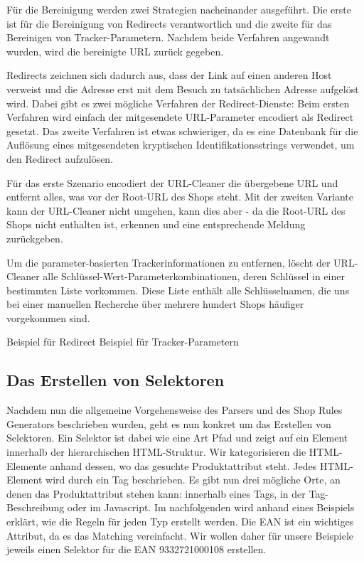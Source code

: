 Für die Bereinigung werden zwei Strategien nacheinander ausgeführt.
Die erste ist für die Bereinigung von Redirects verantwortlich und die zweite für das Bereinigen von Tracker-Parametern.
Nachdem beide Verfahren angewandt wurden, wird die bereinigte URL zurück gegeben.

Redirects zeichnen sich dadurch aus, dass der Link auf einen anderen Host verweist und die Adresse erst mit dem
Besuch zu tatsächlichen Adresse aufgelöst wird.
Dabei gibt es zwei mögliche Verfahren der Redirect-Dienste:
Beim ersten Verfahren wird einfach der mitgesendete URL-Parameter encodiert als Redirect gesetzt.
Das zweite Verfahren ist etwas schwieriger, da es eine Datenbank für die Auflösung eines mitgesendeten kryptischen
Identifikationsstrings verwendet, um den Redirect aufzulösen.

Für das erste Szenario encodiert der URL-Cleaner die übergebene URL und entfernt alles, was vor der Root-URL des
Shops steht.
Mit der zweiten Variante kann der URL-Cleaner nicht umgehen, kann dies aber - da die Root-URL des Shops nicht
enthalten ist, erkennen und eine entsprechende Meldung zurückgeben.

Um die parameter-basierten Trackerinformationen zu entfernen, löscht der URL-Cleaner alle
Schlüssel-Wert-Parameterkombinationen, deren Schlüssel in einer bestimmten Liste vorkommen.
Diese Liste enthält alle Schlüsselnamen, die uns bei einer manuellen Recherche über mehrere hundert Shops häufiger
vorgekommen sind.

Beispiel für Redirect
Beispiel für Tracker-Parametern

\subsection{Das Erstellen von Selektoren}
\label{subsec:erstellen-von-selektoren}

Nachdem nun die allgemeine Vorgehensweise des Parsers und des Shop Rules Generators beschrieben wurden, geht es nun
konkret um das Erstellen von Selektoren.
Ein Selektor ist dabei wie eine Art Pfad und zeigt auf ein Element innerhalb der hierarchischen HTML-Struktur.
Wir kategorisieren die HTML-Elemente anhand dessen, wo das gesuchte Produktattribut steht.
Jedes HTML-Element wird durch ein Tag beschrieben.
Es gibt nun drei mögliche Orte, an denen das Produktattribut stehen kann: innerhalb eines Tags, in der Tag-Beschreibung
oder im Javascript.
Im nachfolgenden wird anhand eines Beispiels erklärt, wie die Regeln für jeden Typ erstellt werden.
Die EAN ist ein wichtiges Attribut, da es das Matching vereinfacht.
Wir wollen daher für unsere Beispiele jeweils einen Selektor für die EAN 9332721000108 erstellen.

